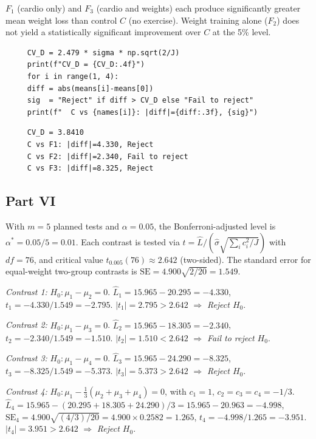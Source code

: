 \documentclass[letterpaper]{article}
\begin{document}
		$F_1$ (cardio only) and $F_3$ (cardio and weights) each produce
		significantly greater mean weight loss than control $C$ (no exercise). Weight training
		alone ($F_2$) does not yield a statistically significant improvement over $C$ at the 5\% level.
		
		\begin{lstlisting}
     CV_D = 2.479 * sigma * np.sqrt(2/J)
     print(f"CV_D = {CV_D:.4f}")
     for i in range(1, 4):
     diff = abs(means[i]-means[0])
     sig  = "Reject" if diff > CV_D else "Fail to reject"
     print(f"  C vs {names[i]}: |diff|={diff:.3f}, {sig}")
		\end{lstlisting}
 \begin{minipage}{\linewidth}
 	\begin{Verbatim}
     CV_D = 3.8410
     C vs F1: |diff|=4.330, Reject
     C vs F2: |diff|=2.340, Fail to reject
     C vs F3: |diff|=8.325, Reject
 	\end{Verbatim}
 \end{minipage}
		\clearpage
		\subsection{Part VI} With $m = 5$ planned tests and $\alpha = 0.05$, the Bonferroni-adjusted
		level is $\alpha^* = 0.05/5 = 0.01$. Each contrast is tested via
		$t = \hat{L} / (\hat{\sigma}\sqrt{\sum_i c_i^2/J})$ with $df = 76$,
		and critical value $t_{0.005}(76) \approx 2.642$ (two-sided).
		The standard error for equal-weight two-group contrasts is
		$\mathrm{SE} = 4.900\sqrt{2/20} = 1.549$.
		
		\emph{Contrast 1:} $H_0: \mu_1 - \mu_2 = 0$.
		$\hat{L}_1 = 15.965 - 20.295 = -4.330$,
		$t_1 = -4.330/1.549 = -2.795$.
		$|t_1| = 2.795 > 2.642$ $\Rightarrow$ \emph{Reject $H_0$}.
		
		\emph{Contrast 2:} $H_0: \mu_1 - \mu_3 = 0$.
		$\hat{L}_2 = 15.965 - 18.305 = -2.340$,
		$t_2 = -2.340/1.549 = -1.510$.
		$|t_2| = 1.510 < 2.642$ $\Rightarrow$ \emph{Fail to reject $H_0$}.
		
		\emph{Contrast 3:} $H_0: \mu_1 - \mu_4 = 0$.
		$\hat{L}_3 = 15.965 - 24.290 = -8.325$,
		$t_3 = -8.325/1.549 = -5.373$.
		$|t_3| = 5.373 > 2.642$ $\Rightarrow$ \emph{Reject $H_0$}.
		
		\emph{Contrast 4:} $H_0: \mu_1 - \tfrac{1}{3}(\mu_2+\mu_3+\mu_4) = 0$,
		with $c_1 = 1$, $c_2 = c_3 = c_4 = -1/3$.
		$\hat{L}_4 = 15.965 - (20.295 + 18.305 + 24.290)/3 = 15.965 - 20.963 = -4.998$,
		$\mathrm{SE}_4 = 4.900\sqrt{(4/3)/20} = 4.900 \times 0.2582 = 1.265$,
		$t_4 = -4.998/1.265 = -3.951$.
		$|t_4| = 3.951 > 2.642$ $\Rightarrow$ \emph{Reject $H_0$}.
		
\end{document}
